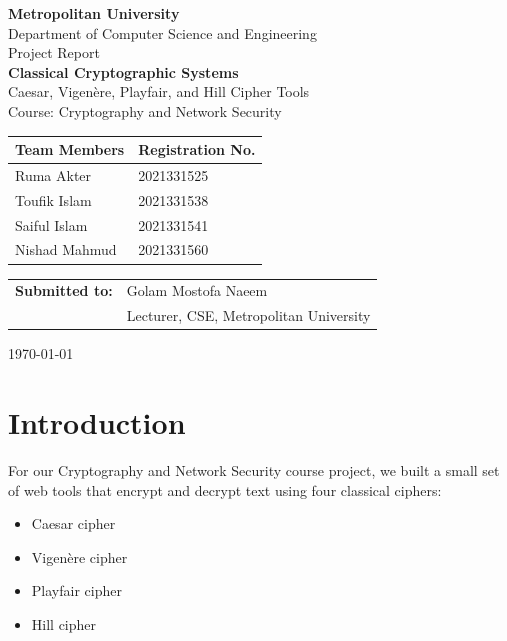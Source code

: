 \documentclass[12pt,a4paper]{article}
\begin{document}
\begin{titlepage}
\centering
\vspace*{1.2cm}

{\Large \textbf{Metropolitan University}}\\[0.3cm]
{\large Department of Computer Science and Engineering}\\[1.2cm]

{\large Project Report}\\[0.4cm]
{\LARGE \textbf{Classical Cryptographic Systems}}\\[0.3cm]
{\large Caesar, Vigen\`{e}re, Playfair, and Hill Cipher Tools}\\[0.6cm]
{\large Course: Cryptography and Network Security}\\[1.8cm]

\begin{tabular}{ll}
\toprule
\textbf{Team Members} & \textbf{Registration No.} \\
\midrule
Ruma Akter & 2021331525 \\
Toufik Islam & 2021331538 \\
Saiful Islam & 2021331541 \\
Nishad Mahmud & 2021331560 \\
\bottomrule
\end{tabular}

\vspace{1.8cm}

\begin{tabular}{ll}
\textbf{Submitted to:} & Golam Mostofa Naeem \\
 & Lecturer, CSE, Metropolitan University \\
\end{tabular}

\vfill
{\large \today}
\end{titlepage}

\tableofcontents
\newpage

\section{Introduction}

For our Cryptography and Network Security course project, we built a small set of web tools that encrypt and decrypt text using four classical ciphers:

\begin{itemize}[leftmargin=*]
  \item Caesar cipher
  \item Vigen\`{e}re cipher
  \item Playfair cipher
  \item Hill cipher
\end{itemize}
\end{document}
